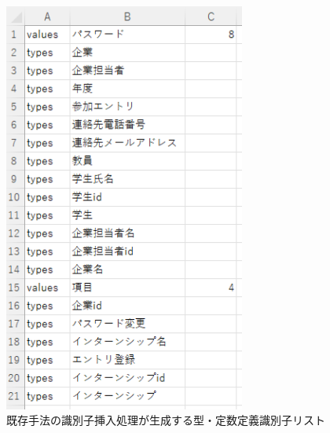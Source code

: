 \begin{figure}[tp]
    \begin{center}
        \includegraphics[width=300]{image/exis_katateisu_id_list.PNG}
        \caption{既存手法の識別子挿入処理が生成する型・定数定義識別子リスト}
        \label{fig:exis_katateisu_id_list}
    \end{center}
\end{figure}


